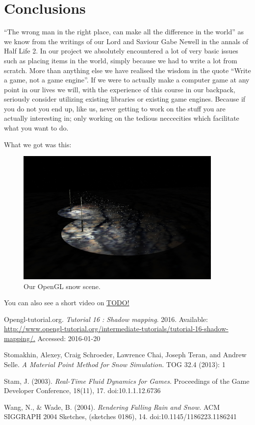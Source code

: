 \documentclass[a4paper,12pt]{article}
\begin{document}
\section{Conclusions}

``The wrong man in the right place, can make all the difference in the world'' as we know from the writings of our Lord and Saviour Gabe Newell in the annals of Half Life 2. In our project we absolutely encountered a lot of very basic issues such as placing items in the world, simply because we had to write a lot from scratch. More than anything else we have realised the wisdom in the quote ``Write a game, not a game engine''. If we were to actually make a computer game at any point in our lives we will, with the experience of this course in our backpack, seriously consider utilizing existing libraries or existing game engines. Because if you do not you end up, like us, never getting to work on the stuff you are actually interesting in; only working on the tedious neccecities which facilitate what you want to do.

What we got was this:

\begin{figure}[ht]
  \centering
  \includegraphics[width=0.9\textwidth]{result}
  \caption{\label{fig:label} Our OpenGL snow scene.}
\end{figure}

You can also see a short video on \href{YouTube}{TODO!}

\newpage

\begin{thebibliography}{9}
    Opengl-tutorial.org.
    \emph{Tutorial 16 : Shadow mapping}.
    2016.
    Available: \url{http://www.opengl-tutorial.org/intermediate-tutorials/tutorial-16-shadow-mapping/.}
    Accessed: 2016-01-20 

    Stomakhin, Alexey, Craig Schroeder, Lawrence Chai, Joseph Teran, and Andrew Selle.
    \emph{A Material Point Method for Snow Simulation.}
    TOG 32.4 (2013): 1

    Stam, J. (2003).
    \emph{Real-Time Fluid Dynamics for Games.}
    Proceedings of the Game Developer Conference, 18(11), 17. doi:10.1.1.12.6736

    Wang, N., \& Wade, B. (2004).
    \emph{Rendering Falling Rain and Snow.}
    ACM SIGGRAPH 2004 Sketches, (sketches 0186), 14. doi:10.1145/1186223.1186241

\end{thebibliography}
\end{document}

